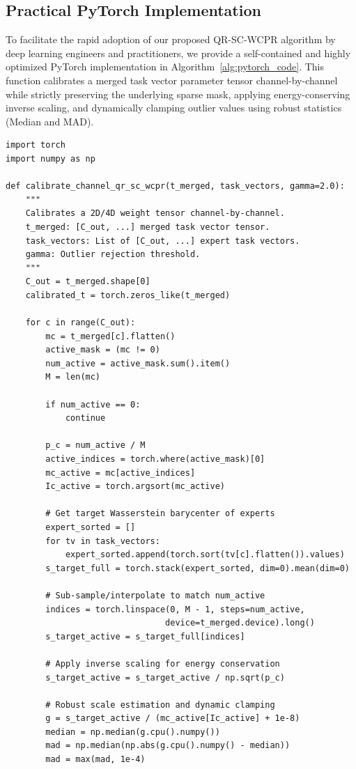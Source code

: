 \documentclass{article}
\theoremstyle{plain}
\theoremstyle{definition}
\theoremstyle{remark}
\begin{document}
\subsection{Practical PyTorch Implementation}
To facilitate the rapid adoption of our proposed QR-SC-WCPR algorithm by deep learning engineers and practitioners, we provide a self-contained and highly optimized PyTorch implementation in Algorithm~\ref{alg:pytorch_code}. This function calibrates a merged task vector parameter tensor channel-by-channel while strictly preserving the underlying sparse mask, applying energy-conserving inverse scaling, and dynamically clamping outlier values using robust statistics (Median and MAD).

\begin{verbatim}
import torch
import numpy as np

def calibrate_channel_qr_sc_wcpr(t_merged, task_vectors, gamma=2.0):
    """
    Calibrates a 2D/4D weight tensor channel-by-channel.
    t_merged: [C_out, ...] merged task vector tensor.
    task_vectors: List of [C_out, ...] expert task vectors.
    gamma: Outlier rejection threshold.
    """
    C_out = t_merged.shape[0]
    calibrated_t = torch.zeros_like(t_merged)
    
    for c in range(C_out):
        mc = t_merged[c].flatten()
        active_mask = (mc != 0)
        num_active = active_mask.sum().item()
        M = len(mc)
        
        if num_active == 0:
            continue
            
        p_c = num_active / M
        active_indices = torch.where(active_mask)[0]
        mc_active = mc[active_indices]
        Ic_active = torch.argsort(mc_active)
        
        # Get target Wasserstein barycenter of experts
        expert_sorted = []
        for tv in task_vectors:
            expert_sorted.append(torch.sort(tv[c].flatten()).values)
        s_target_full = torch.stack(expert_sorted, dim=0).mean(dim=0)
        
        # Sub-sample/interpolate to match num_active
        indices = torch.linspace(0, M - 1, steps=num_active, 
                                device=t_merged.device).long()
        s_target_active = s_target_full[indices]
        
        # Apply inverse scaling for energy conservation
        s_target_active = s_target_active / np.sqrt(p_c)
        
        # Robust scale estimation and dynamic clamping
        g = s_target_active / (mc_active[Ic_active] + 1e-8)
        median = np.median(g.cpu().numpy())
        mad = np.median(np.abs(g.cpu().numpy() - median))
        mad = max(mad, 1e-4)
        

\end{verbatim}
\end{document}
